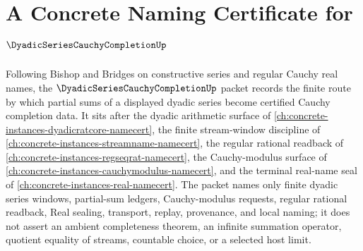 \chapter{A Concrete Naming Certificate for $\DyadicSeriesCauchyCompletionUp$}
\label{ch:concrete-instances-dyadic-series-cauchy-completion-namecert}

Following Bishop and Bridges on constructive series and regular Cauchy real names, the $\DyadicSeriesCauchyCompletionUp$ packet records the finite route by which partial sums of a displayed dyadic series become certified Cauchy completion data. It sits after the dyadic arithmetic surface of \autoref{ch:concrete-instances-dyadicratcore-namecert}, the finite stream-window discipline of \autoref{ch:concrete-instances-streamname-namecert}, the regular rational readback of \autoref{ch:concrete-instances-regseqrat-namecert}, the Cauchy-modulus surface of \autoref{ch:concrete-instances-cauchymodulus-namecert}, and the terminal real-name seal of \autoref{ch:concrete-instances-real-namecert}. The packet names only finite dyadic series windows, partial-sum ledgers, Cauchy-modulus requests, regular rational readback, Real sealing, transport, replay, provenance, and local naming; it does not assert an ambient completeness theorem, an infinite summation operator, quotient equality of streams, countable choice, or a selected host limit.

